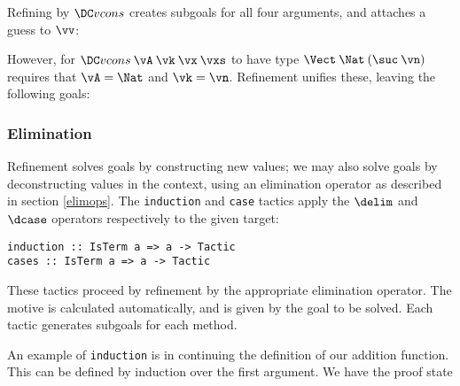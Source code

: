 Refining by $\Vcons$ creates subgoals for all four arguments, and
attaches a guess to $\vv$:
\DM{
\Axiom{
\AR{
\hole{\vA}{\Type}\\
\hole{\vk}{\Nat}\\
\hole{\vx}{\vA}\\
\hole{\vxs}{\Vect\:\vA\:\vk}\\
\guess{\vv}{\Vect\:\Nat\:(\suc\:\vn)}{\Vcons\:\vA\:\vk\:\vx\:\vxs}
}
}
}

However, for $\Vcons\:\vA\:\vk\:\vx\:\vxs$ to have type
$\Vect\:\Nat\:(\suc\:\vn)$ requires that $\vA=\Nat$ and $\vk=\vn$.
Refinement unifies these, leaving the
following goals:
\DM{
\Axiom{
\AR{
\hole{\vx}{\Nat}\\
\hole{\vxs}{\Vect\:\Nat\:\vn}\\
\guess{\vv}{\Vect\:\Nat\:(\suc\:\vn)}{\Vcons\:\Nat\:\vn\:\vx\:\vxs}
}
}
}


\subsubsection{Elimination}

Refinement solves goals by constructing new values; we may also solve
goals by deconstructing values in the context, using an elimination
operator as described in section \ref{elimops}. The \texttt{induction}
and \texttt{case} tactics apply the $\delim$ and $\dcase$ operators
respectively to the given target:

\begin{verbatim}
induction :: IsTerm a => a -> Tactic
cases :: IsTerm a => a -> Tactic
\end{verbatim}

These tactics proceed by refinement by the appropriate elimination
operator. The motive is calculated automatically, and is given by the
goal to be solved. Each tactic generates subgoals for each method.




An example of \texttt{induction} is in continuing the definition of
our addition function. This can be defined by induction over the first
argument. We have the proof state

